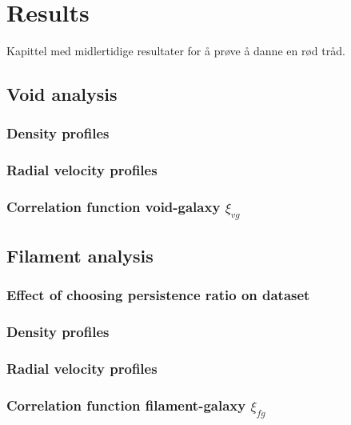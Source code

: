 \chapter{Results}
Kapittel med midlertidige resultater for å prøve å danne en rød tråd.
\section{Void analysis}
\subsection{Density profiles}
\subsection{Radial velocity profiles}
\subsection{Correlation function void-galaxy $\xi_{vg}$}

\section{Filament analysis}
\subsection{Effect of choosing persistence ratio on dataset}
\subsection{Density profiles}
\subsection{Radial velocity profiles}
\subsection{Correlation function filament-galaxy $\xi_{fg}$}
